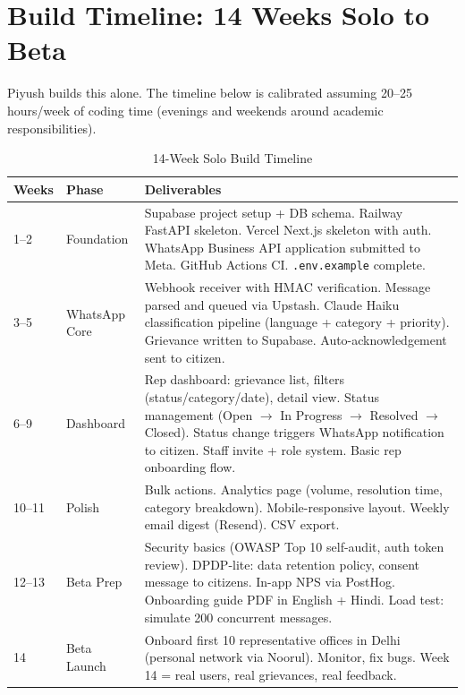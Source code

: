\documentclass[12pt, a4paper]{article}
\begin{document}
\newpage

\section{Build Timeline: 14 Weeks Solo to Beta}

Piyush builds this alone. The timeline below is calibrated assuming 20--25 hours/week of coding time (evenings and weekends around academic responsibilities).

\begin{table}[ht]
\centering
\caption{14-Week Solo Build Timeline}
\renewcommand{\arraystretch}{1.6}
\begin{tabularx}{\textwidth}{p{2cm} p{3cm} X}
\toprule
\rowcolor{pollitylightblue}
\textbf{Weeks} & \textbf{Phase} & \textbf{Deliverables} \\
\midrule
1--2  & Foundation     & Supabase project setup + DB schema. Railway FastAPI skeleton. Vercel Next.js skeleton with auth. WhatsApp Business API application submitted to Meta. GitHub Actions CI. \texttt{.env.example} complete. \\
\midrule
3--5  & WhatsApp Core  & Webhook receiver with HMAC verification. Message parsed and queued via Upstash. Claude Haiku classification pipeline (language + category + priority). Grievance written to Supabase. Auto-acknowledgement sent to citizen. \\
\midrule
6--9  & Dashboard      & Rep dashboard: grievance list, filters (status/category/date), detail view. Status management (Open $\to$ In Progress $\to$ Resolved $\to$ Closed). Status change triggers WhatsApp notification to citizen. Staff invite + role system. Basic rep onboarding flow. \\
\midrule
10--11 & Polish        & Bulk actions. Analytics page (volume, resolution time, category breakdown). Mobile-responsive layout. Weekly email digest (Resend). CSV export. \\
\midrule
12--13 & Beta Prep     & Security basics (OWASP Top 10 self-audit, auth token review). DPDP-lite: data retention policy, consent message to citizens. In-app NPS via PostHog. Onboarding guide PDF in English + Hindi. Load test: simulate 200 concurrent messages. \\
\midrule
14    & Beta Launch    & Onboard first 10 representative offices in Delhi (personal network via Noorul). Monitor, fix bugs. Week 14 = real users, real grievances, real feedback. \\
\bottomrule
\end{tabularx}
\end{table}
\end{document}
